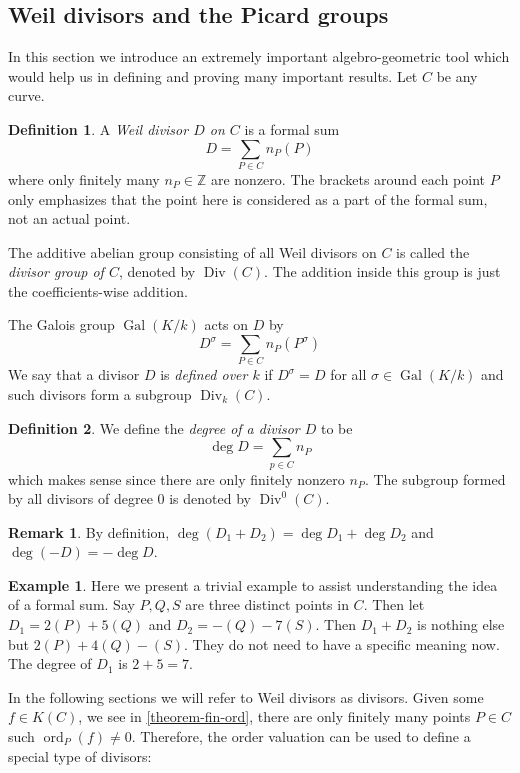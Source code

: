 \documentclass[12pt]{article}
\theoremstyle{remark}
\theoremstyle{definition}
\newtheorem{remark}{Remark}[subsection]
\newtheorem{example}{Example}[subsection]
\newtheorem{definition}{Definition}[subsection]
\newcommand{\ord}[0]{\operatorname{ord}}
\newcommand{\s}[0]{\sigma}
\newcommand{\Z}[0]{\mathbb{Z}}
\newcommand{\Gal}[0]{\operatorname{Gal}}
\newcommand{\Div}[0]{\operatorname{Div}}
\begin{document}
        \subsection{Weil divisors and the Picard groups}\label{ssec-divisor}
            In this section we introduce an extremely important algebro-geometric tool which would help us in defining and proving many important results. Let $C$ be any curve.
            \begin{definition}
                A \textit{Weil divisor $D$ on $C$} is a formal sum
                \[D=\sum_{P\in C}n_P(P)\]
                where only finitely many $n_P\in\Z$ are nonzero. The brackets around each point $P$ only emphasizes that the point here is considered as a part of the formal sum, not an actual point.
            
                The additive abelian group consisting of all Weil divisors on $C$ is called the \textit{divisor group of $C$}, denoted by $\Div(C)$. The addition inside this group is just the coefficients-wise addition.
            \end{definition}
            \noindent The Galois group $\Gal(K/k)$ acts on $D$ by 
            \[D^\s=\sum_{P\in C}n_P(P^\s)\]
            We say that a divisor $D$ is \textit{defined over $k$} if $D^\s=D$ for all $\s\in\Gal(K/k)$ and such divisors form a subgroup $\Div_k(C)$.
            \begin{definition}
                We define the \textit{degree of a divisor $D$} to be
                \[\deg D=\sum_{p\in C}n_P\]
                which makes sense since there are only finitely nonzero $n_P$. The subgroup formed by all divisors of degree $0$ is denoted by $\Div^0(C)$.
            \end{definition}
            \begin{remark}
                By definition, $\deg (D_1+D_2)=\deg D_1+\deg D_2$ and $\deg (-D)=-\deg D$.
            \end{remark}
            \begin{example}
                Here we present a trivial example to assist understanding the idea of a formal sum. Say $P, Q, S$ are three distinct points in $C$. Then let $D_1=2(P)+5(Q)$ and $D_2=-(Q)-7(S)$. Then $D_1+D_2$ is nothing else but $2(P)+4(Q)-(S)$. They do not need to have a specific meaning now. The degree of $D_1$ is $2+5=7$.
            \end{example}
            \noindent In the following sections we will refer to Weil divisors as divisors. Given some $f\in K(C)$, we see in \autoref{theorem-fin-ord}, there are only finitely many points $P\in C$ such $\ord_P(f)\neq 0$. Therefore, the order valuation can be used to define a special type of divisors:
\end{document}
